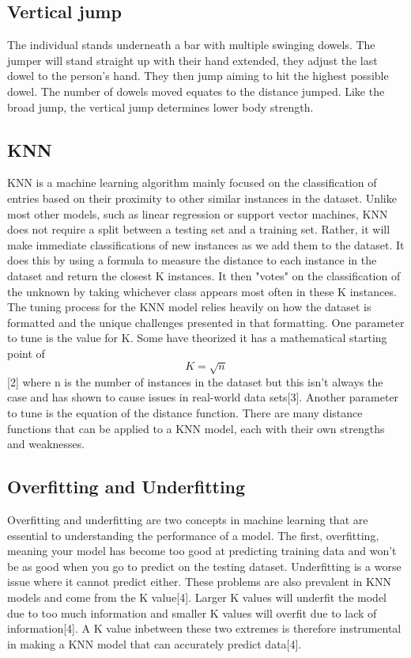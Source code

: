 \documentclass[confrence]{IEEEtran}
\begin{document}
\subsection*{Vertical jump}
The individual stands underneath a bar with multiple swinging dowels.
The jumper will stand straight up with their hand extended, they adjust the last dowel to the person's hand.
They then jump aiming to hit the highest possible dowel.
The number of dowels moved equates to the distance jumped.
Like the broad jump, the vertical jump determines lower body strength.
\subsection*{KNN}
KNN is a machine learning algorithm mainly focused on the classification of entries based on their proximity to other similar instances in the dataset.
Unlike most other models, such as linear regression or support vector machines, KNN does not require a split between a testing set and a training set.
Rather, it will make immediate classifications of new instances as we add them to the dataset.
It does this by using a formula to measure the distance to each instance in the dataset and return the closest K instances. It then "votes" on the classification of the unknown by taking whichever class appears most often in these K instances.
The tuning process for the KNN model relies heavily on how the dataset is formatted and the unique challenges presented in that formatting.
One parameter to tune is the value for K.
Some have theorized it has a mathematical starting point of \[K = \sqrt{n}\][2] where n is the number of instances in the dataset but this isn't always the case and has shown to cause issues in real-world data sets[3].
Another parameter to tune is the equation of the distance function.
There are many distance functions that can be applied to a KNN model, each with their own strengths and weaknesses.
\subsection*{Overfitting and Underfitting}
Overfitting and underfitting are two concepts in machine learning that are essential to understanding the performance of a model.
The first, overfitting, meaning your model has become too good at predicting training data and won't be as good when you go to predict on the testing dataset.
Underfitting is a worse issue where it cannot predict either. These problems are also prevalent in KNN models and come from the K value[4].
Larger K values will underfit the model due to too much information and smaller K values will overfit due to lack of information[4].
A K value inbetween these two extremes is therefore instrumental in making a KNN model that can accurately predict data[4].
\end{document}
